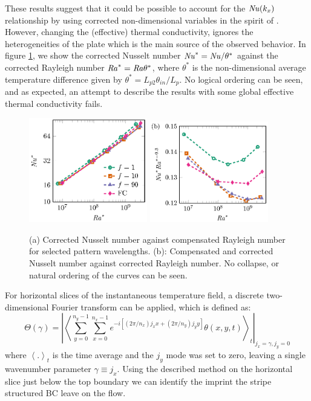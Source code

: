 \documentclass{jfm}
\newcommand\Ray{\mbox{\textit{Ra}}}  %
\newcommand\Nus{\mbox{\textit{Nu}}}  %
\begin{document}
These results suggest that it could be possible to account for the $\Nus(k_x)$
relationship by using corrected non-dimensional variables in the spirit of
\cite{ver04}. However, changing the (effective) thermal conductivity, ignores
the heterogeneities of the plate which is the main source of the observed
behavior. In figure \ref{figure5}, we show the corrected Nusselt number
$\Nus^*=\Nus/\theta^*$ against the corrected Rayleigh number $\Ray^*=\Ray
\theta^*$, where $\theta^*$ is the non-dimensional average temperature
difference given by $\theta^*=L_{p2}\theta_{in}/L_p$. No logical ordering can
be seen, and as expected, an attempt to describe the results with some global
effective thermal conductivity fails.


\begin{figure}
\centering
\includegraphics[width=0.46\textwidth]{fig6a.eps}
\includegraphics[width=0.46\textwidth]{fig6b.eps}
\caption{%
(a) Corrected Nusselt number against compensated Rayleigh number
for selected pattern wavelengths. (b): Compensated and corrected
Nusselt number against corrected Rayleigh number.
No collapse, or natural ordering of the 
curves can be seen.  }
\label{figure5}
\end{figure}


%
For horizontal slices of the instantaneous temperature field, a discrete
two-dimensional Fourier transform can be applied, which is defined as:
%
\begin{equation} \Theta(\gamma) = \left| \left< \sum\limits_{y=0}^{n_y-1}
\sum\limits_{x=0}^{n_x-1} e^{-i\left[ (2\pi / n_x)j_x x + (2\pi/n_y)j_y
y\right]} \theta(x,y,t) \right>_{t} \right|_{j_x=\gamma,j_y=0} \end{equation}
%
where $\left< . \right>_t$ is the time average and the $j_y$ mode was set to
zero, leaving a single wavenumber parameter $\gamma \equiv j_x$.
Using the described method on the horizontal slice just below the top boundary
we can identify the imprint the stripe structured BC leave on the flow.
\end{document}
